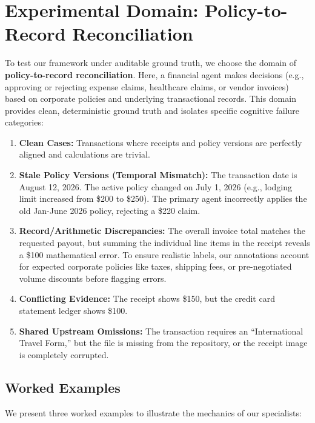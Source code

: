 \documentclass[manuscript,screen,nonacm]{acmart}
\begin{document}
\section{Experimental Domain: Policy-to-Record Reconciliation}
\label{sec:domain}

To test our framework under auditable ground truth, we choose the domain of \textbf{policy-to-record reconciliation}. Here, a financial agent makes decisions (e.g., approving or rejecting expense claims, healthcare claims, or vendor invoices) based on corporate policies and underlying transactional records. This domain provides clean, deterministic ground truth and isolates specific cognitive failure categories:

\begin{enumerate}
    \item \textbf{Clean Cases:} Transactions where receipts and policy versions are perfectly aligned and calculations are trivial.
    \item \textbf{Stale Policy Versions (Temporal Mismatch):} The transaction date is August 12, 2026. The active policy changed on July 1, 2026 (e.g., lodging limit increased from \$200 to \$250). The primary agent incorrectly applies the old Jan-June 2026 policy, rejecting a \$220 claim.
    \item \textbf{Record/Arithmetic Discrepancies:} The overall invoice total matches the requested payout, but summing the individual line items in the receipt reveals a \$100 mathematical error. To ensure realistic labels, our annotations account for expected corporate policies like taxes, shipping fees, or pre-negotiated volume discounts before flagging errors.
    \item \textbf{Conflicting Evidence:} The receipt shows \$150, but the credit card statement ledger shows \$100.
    \item \textbf{Shared Upstream Omissions:} The transaction requires an ``International Travel Form,'' but the file is missing from the repository, or the receipt image is completely corrupted.
\end{enumerate}

\subsection{Worked Examples}
We present three worked examples to illustrate the mechanics of our specialists:
\end{document}
